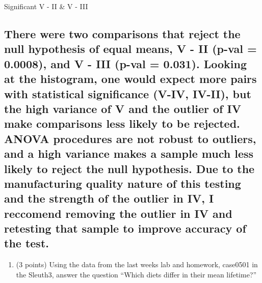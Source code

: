 \documentclass[
]{article}
\providecommand{\tightlist}{%
  \setlength{\itemsep}{0pt}\setlength{\parskip}{0pt}}
\begin{document}
Significant V - II \& V - III

\hypertarget{there-were-two-comparisons-that-reject-the-null-hypothesis-of-equal-means-v---ii-p-val-0.0008-and-v---iii-p-val-0.031.-looking-at-the-histogram-one-would-expect-more-pairs-with-statistical-significance-v-iv-iv-ii-but-the-high-variance-of-v-and-the-outlier-of-iv-make-comparisons-less-likely-to-be-rejected.-anova-procedures-are-not-robust-to-outliers-and-a-high-variance-makes-a-sample-much-less-likely-to-reject-the-null-hypothesis.-due-to-the-manufacturing-quality-nature-of-this-testing-and-the-strength-of-the-outlier-in-iv-i-reccomend-removing-the-outlier-in-iv-and-retesting-that-sample-to-improve-accuracy-of-the-test.}{%
\subsection{There were two comparisons that reject the null hypothesis
of equal means, V - II (p-val = 0.0008), and V - III (p-val = 0.031).
Looking at the histogram, one would expect more pairs with statistical
significance (V-IV, IV-II), but the high variance of V and the outlier
of IV make comparisons less likely to be rejected. ANOVA procedures are
not robust to outliers, and a high variance makes a sample much less
likely to reject the null hypothesis. Due to the manufacturing quality
nature of this testing and the strength of the outlier in IV, I
reccomend removing the outlier in IV and retesting that sample to
improve accuracy of the
test.}\label{there-were-two-comparisons-that-reject-the-null-hypothesis-of-equal-means-v---ii-p-val-0.0008-and-v---iii-p-val-0.031.-looking-at-the-histogram-one-would-expect-more-pairs-with-statistical-significance-v-iv-iv-ii-but-the-high-variance-of-v-and-the-outlier-of-iv-make-comparisons-less-likely-to-be-rejected.-anova-procedures-are-not-robust-to-outliers-and-a-high-variance-makes-a-sample-much-less-likely-to-reject-the-null-hypothesis.-due-to-the-manufacturing-quality-nature-of-this-testing-and-the-strength-of-the-outlier-in-iv-i-reccomend-removing-the-outlier-in-iv-and-retesting-that-sample-to-improve-accuracy-of-the-test.}}

\begin{enumerate}
\def\labelenumi{\arabic{enumi}.}
\setcounter{enumi}{1}
\tightlist
\item
  (3 points) Using the data from the last weeks lab and homework,
  case0501 in the Sleuth3, answer the question ``Which diets differ in
  their mean lifetime?''
\end{enumerate}
\end{document}
